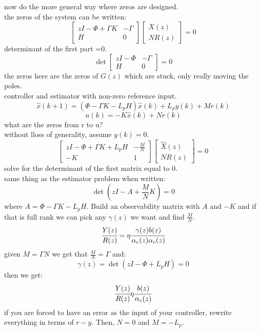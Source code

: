 \documentclass{article}
\begin{document}
now do the more general way where zeros are designed.\\
the zeros of the system can be written:
\[\begin{bmatrix}zI-\Phi+\Gamma K & -\Gamma\\H&0\end{bmatrix}\begin{bmatrix}X(z)\\NR(z)\end{bmatrix}=0\]
determinant of the first part =0.\\
\[\det\begin{bmatrix}zI-\Phi&-\Gamma\\H & 0\end{bmatrix}=0\]
the zeros here are the zeros of $G(z)$ which are stuck, only really moving the poles.\\


controller and estimator with non-zero reference input.\\
\[\hat{x}(k+1)=(\Phi-\Gamma K-L_pH)\hat{x}(k)+L_py(k)+Mr(k)\]
\[u(k)=-K\hat{x}(k)+Nr(k)\]
what are the zeros from r to u?\\
without lloss of generality, assume $y(k)=0$.\\
\[\begin{bmatrix}zI-\Phi+\Gamma K+L_pH&-\frac{M}{N}\\-K&1\end{bmatrix}\begin{bmatrix}\hat{X}(z)\\NR(z)\end{bmatrix}=0\]
solve for the determinant of the first matrix equal to 0.\\

same thing as the estimator problem when written:
\[\det (zI-A+\frac{M}{N}K)=0\]
where $A=\Phi-\Gamma K-L_pH$. Build an observability matrix with $A$ and $-K$ and if that is full rank we can pick any $\gamma(z)$ we want and find $\frac{M}{N}$.\\
\[\cfrac{Y(z)}{R(z)}=\eta\cfrac{\gamma(z)b(z)}{\alpha_e(z)\alpha_c(z)}\]
given $M=\Gamma N$ we get that $\frac{M}{N}=\Gamma$ and:
\[\gamma(z)=\det(zI-\Phi+L_pH)=0\]
then we get:
\[\cfrac{Y(z)}{R(z)}\eta\cfrac{b(z)}{\alpha_c(z)}\]
if you are forced to have an error as the input of your controller, rewrite everything in terms of $r-y$. Then, $N=0$ and $M=-L_p$.\\
\end{document}
